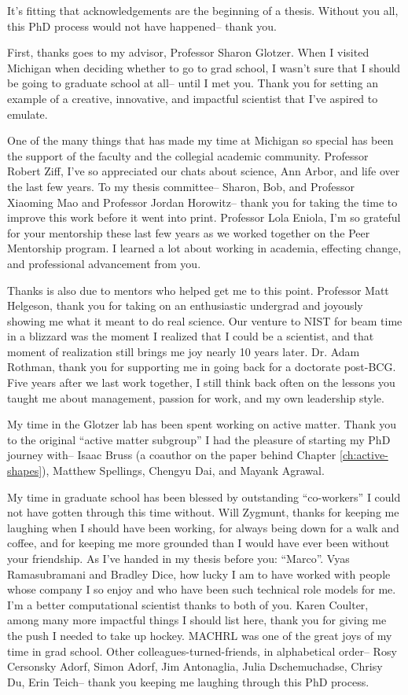 It's fitting that acknowledgements are the beginning of a thesis.
Without you all, this PhD process would not have happened-- thank you.

First, thanks goes to my advisor, Professor Sharon Glotzer.
When I visited Michigan when deciding whether to go to grad school, I wasn't sure that I should be going to graduate school at all-- until I met you.
Thank you for setting an example of a creative, innovative, and impactful scientist that I've aspired to emulate.

One of the many things that has made my time at Michigan so special has been the support of the faculty and the collegial academic community.
Professor Robert Ziff, I've so appreciated our chats about science, Ann Arbor, and life over the last few years.
To my thesis committee-- Sharon, Bob, and Professor Xiaoming Mao and Professor Jordan Horowitz-- thank you for taking the time to improve this work before it went into print.
Professor Lola Eniola, I'm so grateful for your mentorship these last few years as we worked together on the Peer Mentorship program. I learned a lot about working in academia, effecting change, and professional advancement from you.

Thanks is also due to mentors who helped get me to this point.
Professor Matt Helgeson, thank you for taking on an enthusiastic undergrad and joyously showing me what it meant to do real science. Our venture to NIST for beam time in a blizzard was the moment I realized that I could be a scientist, and that moment of realization still brings me joy nearly 10 years later.
Dr. Adam Rothman, thank you for supporting me in going back for a doctorate post-BCG. Five years after we last work together, I still think back often on the lessons you taught me about management, passion for work, and my own leadership style.

My time in the Glotzer lab has been spent working on active matter. Thank you to the original ``active matter subgroup'' I had the pleasure of starting my PhD journey with-- Isaac Bruss (a coauthor on the paper behind Chapter \ref{ch:active-shapes}), Matthew Spellings, Chengyu Dai, and Mayank Agrawal.

My time in graduate school has been blessed by outstanding ``co-workers'' I could not have gotten through this time without.
Will Zygmunt, thanks for keeping me laughing when I should have been working, for always being down for a walk and coffee, and for keeping me more grounded than I would have ever been without your friendship. As I've handed in my thesis before you: ``Marco''.
Vyas Ramasubramani and Bradley Dice, how lucky I am to have worked with people whose company I so enjoy and who have been such technical role models for me. I'm a better computational scientist thanks to both of you.
Karen Coulter, among many more impactful things I should list here, thank you for giving me the push I needed to take up hockey. MACHRL was one of the great joys of my time in grad school.
Other colleagues-turned-friends, in alphabetical order-- Rosy Cersonsky Adorf, Simon Adorf, Jim Antonaglia, Julia Dschemuchadse, Chrisy Du, Erin Teich-- thank you keeping me laughing through this PhD process.

